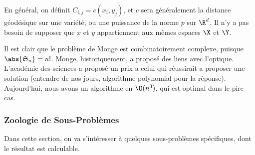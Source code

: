 \documentclass[info, math, french]{mpb-cours}
\begin{document}
En général, on définit $C_{i, j} = c(x_{i}, y_{j})$, et $c$ sera généralement la distance géodésique sur une variété, ou une puissance de la norme $p$ sur $\R^{d}$.
Il n'y a pas besoin de supposer que $x$ et $y$ appartiennent aux mêmes espaces $\X$ et $\Y$.

Il est clair que le problème de Monge est combinatoirement complexe, puisque $\abs{\mathfrak{S}_{n}} = n!$.
Monge, historiquement, a proposé des liens avec l'optique. L'académie des sciences a proposé un prix a
celui qui réussirait a proposer une solution (entendre de nos jours, algorithme polynomial pour la réponse).
Aujourd'hui, nous avons un algorithme en $\O(n^{3})$, qui est optimal dans le pire cas.

\subsubsection{Zoologie de Sous-Problèmes}
Dans cette section, on va s'intéresser à quelques sous-problèmes spécifiques, dont le résultat est calculable.
\end{document}
